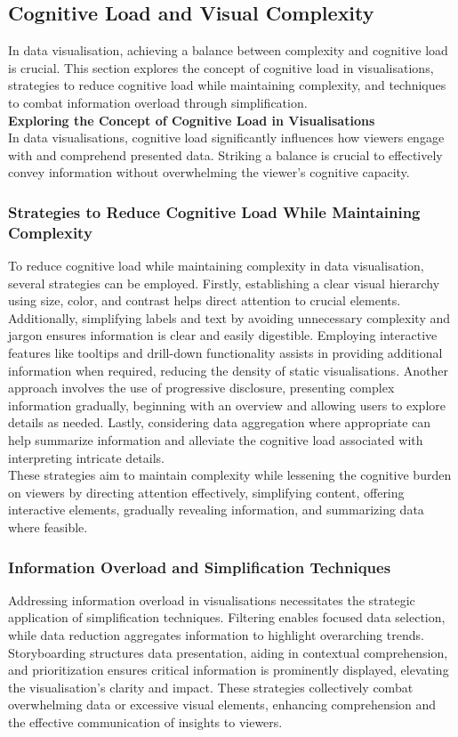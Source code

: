 \documentclass{article}\usepackage[]{graphicx}\usepackage[]{xcolor}
\begin{document}
\subsection{Cognitive Load and Visual Complexity}
In data visualisation, achieving a balance between complexity and cognitive load is crucial. This section explores the concept of cognitive load in visualisations, strategies to reduce cognitive load while maintaining complexity, and techniques to combat information overload through simplification.\\

\noindent \textbf{Exploring the Concept of Cognitive Load in Visualisations}\\
In data visualisations, cognitive load significantly influences how viewers engage with and comprehend presented data. Striking a balance is crucial to effectively convey information without overwhelming the viewer's cognitive capacity.

\subsubsection{Strategies to Reduce Cognitive Load While Maintaining Complexity}
To reduce cognitive load while maintaining complexity in data visualisation, several strategies can be employed. Firstly, establishing a clear visual hierarchy using size, color, and contrast helps direct attention to crucial elements. Additionally, simplifying labels and text by avoiding unnecessary complexity and jargon ensures information is clear and easily digestible. Employing interactive features like tooltips and drill-down functionality assists in providing additional information when required, reducing the density of static visualisations. Another approach involves the use of progressive disclosure, presenting complex information gradually, beginning with an overview and allowing users to explore details as needed. Lastly, considering data aggregation where appropriate can help summarize information and alleviate the cognitive load associated with interpreting intricate details.\\

These strategies aim to maintain complexity while lessening the cognitive burden on viewers by directing attention effectively, simplifying content, offering interactive elements, gradually revealing information, and summarizing data where feasible.

\subsubsection{Information Overload and Simplification Techniques}
Addressing information overload in visualisations necessitates the strategic application of simplification techniques. Filtering enables focused data selection, while data reduction aggregates information to highlight overarching trends. Storyboarding structures data presentation, aiding in contextual comprehension, and prioritization ensures critical information is prominently displayed, elevating the visualisation's clarity and impact. These strategies collectively combat overwhelming data or excessive visual elements, enhancing comprehension and the effective communication of insights to viewers.
\end{document}
